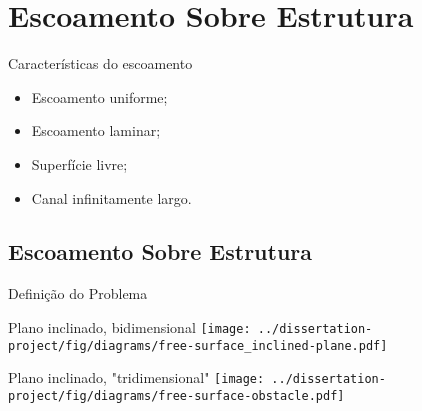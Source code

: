\section{Escoamento Sobre Estrutura}

\begin{frame}{Características do escoamento}
    \Large
    \begin{itemize}
        \item Escoamento uniforme;
        \item Escoamento laminar;
        \item Superfície livre;
        \item Canal infinitamente largo.
    \end{itemize}
\end{frame}

\subsection{Escoamento Sobre Estrutura}

\begin{frame}{Definição do Problema}
    \begin{minipage}[c]{0.49\textwidth}
        \begin{exampleblock}{Plano inclinado, bidimensional}
            \texttt{[image: ../dissertation-project/fig/diagrams/free-surface\_inclined-plane.pdf]}
        \end{exampleblock}
    \end{minipage}
    \hfill
    \begin{minipage}[c]{0.49\textwidth}
        \begin{exampleblock}{Plano inclinado, "tridimensional"}
            \texttt{[image: ../dissertation-project/fig/diagrams/free-surface-obstacle.pdf]}
        \end{exampleblock}
    \end{minipage}
\end{frame}


